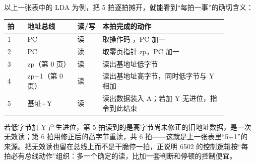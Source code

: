 以上一张表中的 LDA  为例，把 5 拍逐拍摊开，就能看到“每拍一事”的确切含义：

\begin{longtable}{L{0.08\linewidth}L{0.2\linewidth}L{0.1\linewidth}L{0.5\linewidth}}
\toprule
拍 & 地址总线 & 读/写 & 本拍完成的动作 \\
 & PC & 读 & 取操作码 ，PC 加一 \\
2 & PC & 读 & 取零页指针 zp，PC 加一 \\
3 & zp（第 0 页） & 读 & 读出基地址低字节 \\
4 & zp+1（第 0 页） & 读 & 读出基地址高字节，同时低字节与 Y 相加 \\
5 & 基址+Y & 读 & 读出数据装入 A；若加 Y 无进位，指令到此结束 \\
\bottomrule
\end{longtable}

若低字节加 Y 产生进位，第 5 拍读到的是高字节尚未修正的旧地址数据，是一次无效读；第 6 拍用修正后的高字节重读，共 6 拍——这就是上一张表里“5+1”的来源。把无效读也留在总线上而不是干脆停一拍，正说明 6502 的控制逻辑按“每拍必有总线动作”组织：多一个确定的读，比加一套判断和停顿的控制便宜。

